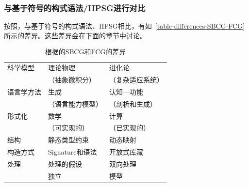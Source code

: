 \subsubsection{与基于符号的构式语法/HPSG进行对比}

按照\indexhpsgstartc\indexsbcgstartc\citet{vanTrijp2013a}，与基于符号的构式语法、HPSG相比，有如~\vref{table-differences-SBCG-FCG}所示的差异。这些差异会在下面的章节中讨论。
%
\begin{table}
\caption{\label{table-differences-SBCG-FCG}根据\citet[]{vanTrijp2013a}的SBCG和FCG的差异}
\begin{tabular}{@{}lll@{}}\hline\hline
科学模型    & 理论物理           & 进化论\\
                    & （抽象微积分）           &  （复杂适应系统）\\
语言学方法 & 生成                    & 认知—功能\\
                    & （语言能力模型）          & （剖析和生成）\\
形式化       & 数学                 & 计算\\ 
                    & （可实现的） & （已实现的）\\
结构       & 静态类型约束       & 动态映射\\
构造方式       & Signature和语法         & 开放式库藏\\
处理          & 处理的假设—     & 双向处理\\
                    & 独立                  & 模型\\\hline\hline
\end{tabular}
\end{table}%
